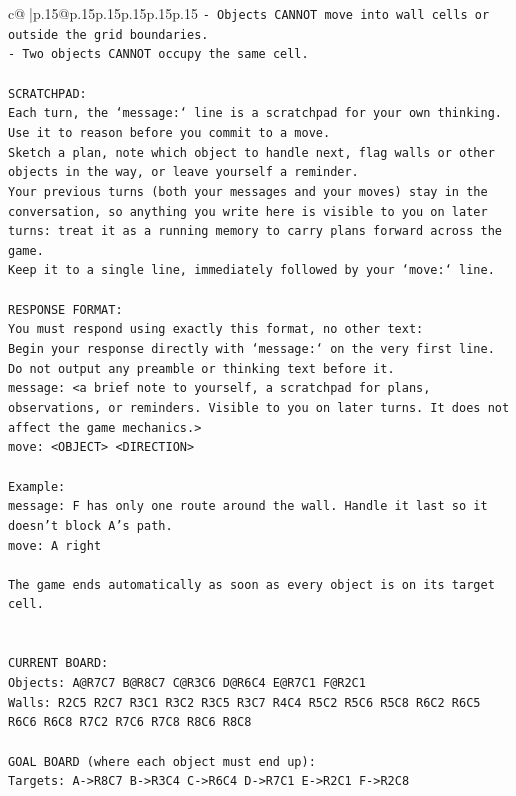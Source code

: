 \documentclass{article}
\begin{document}
{\begin{supertabular}{c@{$\;$}|p{.15\linewidth}@{}p{.15\linewidth}p{.15\linewidth}p{.15\linewidth}p{.15\linewidth}p{.15\linewidth}}
{{{\texttt{{-} Objects CANNOT move into wall cells or outside the grid boundaries.} \\
\texttt{{-} Two objects CANNOT occupy the same cell.} \\
\\ 
\texttt{SCRATCHPAD:} \\
\texttt{Each turn, the `message:` line is a scratchpad for your own thinking. Use it to reason before you commit to a move. } \\
\texttt{Sketch a plan, note which object to handle next, flag walls or other objects in the way, or leave yourself a reminder. } \\
\texttt{Your previous turns (both your messages and your moves) stay in the conversation, so anything you write here is visible to you on later turns: treat it as a running memory to carry plans forward across the game.} \\
\texttt{Keep it to a single line, immediately followed by your `move:` line.} \\
\\ 
\texttt{RESPONSE FORMAT:} \\
\texttt{You must respond using exactly this format, no other text:} \\
\texttt{Begin your response directly with `message:` on the very first line. Do not output any preamble or thinking text before it.} \\
\texttt{message: <a brief note to yourself, a scratchpad for plans, observations, or reminders. Visible to you on later turns. It does not affect the game mechanics.>} \\
\texttt{move: <OBJECT> <DIRECTION>} \\
\\ 
\texttt{Example:} \\
\texttt{message: F has only one route around the wall. Handle it last so it doesn't block A's path.} \\
\texttt{move: A right} \\
\\ 
\texttt{The game ends automatically as soon as every object is on its target cell.} \\
\\ 
\\ 
\texttt{CURRENT BOARD:} \\
\texttt{Objects: A@R7C7 B@R8C7 C@R3C6 D@R6C4 E@R7C1 F@R2C1} \\
\texttt{Walls: R2C5 R2C7 R3C1 R3C2 R3C5 R3C7 R4C4 R5C2 R5C6 R5C8 R6C2 R6C5 R6C6 R6C8 R7C2 R7C6 R7C8 R8C6 R8C8} \\
\\ 
\texttt{GOAL BOARD (where each object must end up):} \\
\texttt{Targets: A{-}>R8C7 B{-}>R3C4 C{-}>R6C4 D{-}>R7C1 E{-}>R2C1 F{-}>R2C8} \\
            }
        }
    }
     \\ \\


\end{supertabular}}
\end{document}
